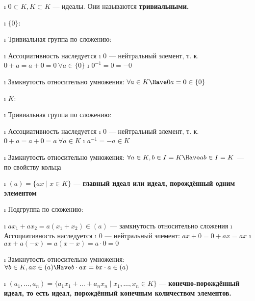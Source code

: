 \begin{solution}

\begin{enumerate}
\def\labelenumi{\alph{enumi})}
\tightlist
\i
  \(0 \subset K, K \subset K\) --- идеалы. Они называются \bf{тривиальными}.

  \begin{itemize}
  \tightlist
  \i
    \(\{0\}\):

    \begin{enumerate}
    \def\labelenumii{\arabic{enumii}.}
    \tightlist
    \i
      Тривиальная группа по сложению:

      \begin{itemize}
      \tightlist
      \i
        Ассоциативность наследуется
      \i
        \(0\) --- нейтральный элемент, т. к. \(0+a=a+0=0\ \forall a \in \{0\}\)
      \i
        \(0^{-1} = 0 = -0\)
      \end{itemize}
    \i
      Замкнутость относительно умножения: \(\forall a \in K \Have  0a=0 \in \{0\}\)
    \end{enumerate}
  \i
    \(K\):

    \begin{enumerate}
    \def\labelenumii{\arabic{enumii}.}
    \tightlist
    \i
      Тривиальная группа по сложению:

      \begin{itemize}
      \tightlist
      \i
        Ассоциативность наследуется
      \i
        \(0\) --- нейтральный элемент, т. к. \(0+a=a+0=a\ \forall a \in K\)
      \i
        \(a^{-1} = -a \in K\)
      \end{itemize}
    \i
      Замкнутость относительно умножения:
      \(\forall a \in K, b \in I=K \Have ab \in I=K\) --- по свойству кольца
    \end{enumerate}
  \end{itemize}
\i
  \((a) = \{ax \mid x\in K\}\) --- \bf{главный идеал} или \bf{идеал, порождённый одним элементом}

  \begin{enumerate}
  \def\labelenumii{\arabic{enumii}.}
  \tightlist
  \i
    Подгруппа по сложению:

    \begin{itemize}
    \tightlist
    \i
      \(ax_1+ax_2=a(x_1+x_2)\in(a)\) --- замкнутость относительно сложения
    \i
      Ассоциативность наследуется
    \i
      \(0\) --- нейтральный элемент: \(ax+0=0+ax=ax\)
    \i
      \(ax+a(-x)=a(x-x)=a\cdot 0=0\)
    \end{itemize}
  \i
    Замкнутость относительно умножения:
    \(\forall b \in K, ax \in (a) \Have b\cdot ax = bx \cdot a \in (a)\)
  \end{enumerate}
\i
  \((a_1,\ldots,a_n) = \{a_1x_1+\ldots+a_nx_n \mid x_1,\ldots,x_n \in K\}\) --- \bf{конечно-порождённый идеал}, то есть идеал, порождённый конечным количеством элементов.


\end{enumerate}
\end{solution}
